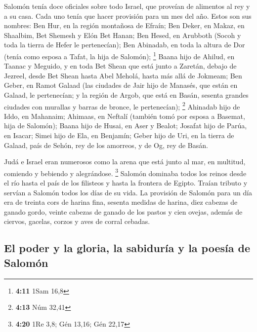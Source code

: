 \begin{paracol}{2}
 Salomón tenía doce oficiales sobre todo Israel, que
proveían de alimentos al rey y a su casa. Cada uno tenía que hacer
provisión para un mes del año.  Estos son sus nombres: Ben
Hur, en la región montañosa de Efraín;  Ben Deker, en
Makaz, en Shaalbim, Bet Shemesh y Elón Bet Hanan;  Ben
Hesed, en Arubboth (Socoh y toda la tierra de Hefer le pertenecían);
 Ben Abinadab, en toda la altura de Dor (tenía como
esposa a Tafat, la hija de Salomón); \footnote{\textbf{4:11} 1Sam 16,8}
 Baana hijo de Ahilud, en Taanac y Meguido, y en toda Bet
Shean que está junto a Zaretán, debajo de Jezreel, desde Bet Shean hasta
Abel Meholá, hasta más allá de Jokmeam;  Ben Geber, en
Ramot Galaad (las ciudades de Jair hijo de Manasés, que están en Galaad,
le pertenecían; y la región de Argob, que está en Basán, sesenta grandes
ciudades con murallas y barras de bronce, le pertenecían); \footnote{\textbf{4:13}
  Núm 32,41}  Ahinadab hijo de Iddo, en Mahanaim;
 Ahimaas, en Neftalí (también tomó por esposa a Basemat,
hija de Salomón);  Baana hijo de Husai, en Aser y Bealot;
 Josafat hijo de Parúa, en Isacar;  Simei
hijo de Ela, en Benjamín;  Geber hijo de Uri, en la
tierra de Galaad, país de Sehón, rey de los amorreos, y de Og, rey de
Basán.

 Judá e Israel eran numerosos como la arena que está
junto al mar, en multitud, comiendo y bebiendo y alegrándose.
\footnote{\textbf{4:20} 1Re 3,8; Gén 13,16; Gén 22,17} 
Salomón dominaba todos los reinos desde el río hasta el país de los
filisteos y hasta la frontera de Egipto. Traían tributo y servían a
Salomón todos los días de su vida.  La provisión de
Salomón para un día era de treinta cors de harina fina, sesenta medidas
de harina,  diez cabezas de ganado gordo, veinte cabezas
de ganado de los pastos y cien ovejas, además de ciervos, gacelas,
corzos y aves de corral cebadas.

\hypertarget{el-poder-y-la-gloria-la-sabiduruxeda-y-la-poesuxeda-de-salomuxf3n}{%
\subsection{El poder y la gloria, la sabiduría y la poesía de
Salomón}\label{el-poder-y-la-gloria-la-sabiduruxeda-y-la-poesuxeda-de-salomuxf3n}}


\end{paracol}
